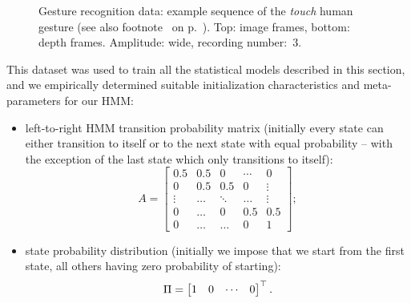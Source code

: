 \begin{figure*}
  \centering


\caption[Gesture recognition data: example sequence of the \emph{touch} human gesture.]{Gesture recognition data: example sequence of the \emph{touch} human gesture (see also footnote~ on p.~\pageref{footnote:touch_gesture}). Top: image frames, bottom: depth frames. Amplitude: wide, recording number:~3.}
\label{fig:gestures:human:touch}
\end{figure*}

This dataset was used to train all the statistical models described in this section, and we empirically determined suitable initialization characteristics and meta-parameters for our \ac{HMM}:
\begin{itemize}
\item left-to-right \ac{HMM} transition probability matrix (initially every state can either transition to itself or to the next state with equal probability -- with the exception of the last state which only transitions to itself):
      \begin{equation*}
      A = \begin{bmatrix}
          0.5    & 0.5   & 0      & \cdots & 0 \\
          0      & 0.5   & 0.5    & 0      & \vdots \\
          \vdots & \dots & \ddots & \dots  & \vdots \\
          0      & \dots & 0      & 0.5   & 0.5 \\
          0      & \dots & \dots  & 0     & 1
          \end{bmatrix};
      \end{equation*}

\item state probability distribution (initially we impose that we start from the first state, all others having zero probability of starting):
      \begin{equation*}
      \Pi = \begin{bmatrix}1 & 0 & \cdots & 0\end{bmatrix}^{\top}.
      \end{equation*}
\end{itemize}

